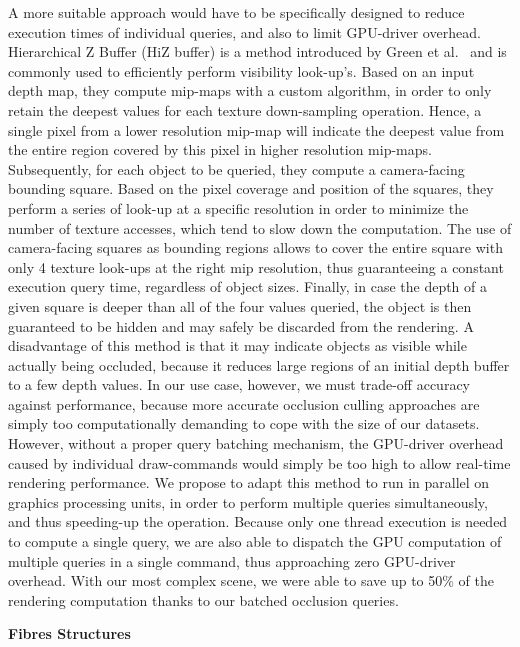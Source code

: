 A more suitable approach would have to be specifically designed to reduce execution times of individual queries, and also to limit GPU-driver overhead.
Hierarchical Z Buffer (HiZ buffer) is a method introduced by Green et al.~\cite{greene1993hierarchical} and is commonly used to efficiently perform visibility look-up's.
Based on an input depth map, they compute mip-maps with a custom algorithm, in order to only retain the deepest values for each texture down-sampling operation.
Hence, a single pixel from a lower resolution mip-map will indicate the deepest value from the entire region covered by this pixel in higher resolution mip-maps.
Subsequently, for each object to be queried, they compute a camera-facing bounding square.
Based on the pixel coverage and position of the squares, they perform a series of look-up at a specific resolution in order to minimize the number of texture accesses, which tend to slow down the computation.
The use of camera-facing squares as bounding regions allows to cover the entire square with only 4 texture look-ups at the right mip resolution, thus guaranteeing a constant execution query time, regardless of object sizes.
Finally, in case the depth of a given square is deeper than all of the four values queried, the object is then guaranteed to be hidden and may safely be discarded from the rendering.
A disadvantage of this method is that it may indicate objects as visible while actually being occluded, because it reduces large regions of an initial depth buffer to a few depth values.
In our use case, however, we must trade-off accuracy against performance, because more accurate occlusion culling approaches are simply too computationally demanding to cope with the size of our datasets.
However, without a proper query batching mechanism, the GPU-driver overhead caused by individual draw-commands would simply be too high to allow real-time rendering performance.
We propose to adapt this method to run in parallel on graphics processing units, in order to perform multiple queries simultaneously, and thus speeding-up the operation.
Because only one thread execution is needed to compute a single query, we are also able to dispatch the GPU computation of multiple queries in a single command, thus approaching zero GPU-driver overhead.
With our most complex scene, we were able to save up to 50\% of the rendering computation thanks to our batched occlusion queries.
 
\textbf{Fibres Structures}


